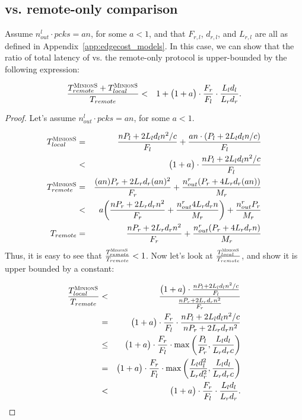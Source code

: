 \subsection{\system vs. remote-only comparison}
\label{app:edgecost_bound}

\begin{proposition}
\label{prop:latency_bound}
Assume $n_{out}^l \cdot pcks = an$, for some $a < 1$, and that $F_{r,l}$, $d_{r,l}$, and $L_{r,l}$ are all as defined in Appendix~\ref{app:edgecost_models}. In this case, we can show that the ratio of total latency of \system vs. the remote-only protocol is upper-bounded by the following expression:

\begin{eqnarray*}
\frac{T_{remote}^{\textsc{MinionS}} + T_{local}^{\textsc{MinionS}}}{T_{remote}} &<& 1 + \big(1 + a \big) \cdot \frac{F_r}{F_l} \cdot \frac{L_l d_l}{L_r d_r}. \\
\end{eqnarray*}

\begin{proof}
    
Let's assume $n_{out}^l \cdot pcks = an$, for some $a < 1$.

\begin{eqnarray*}
T_{local}^{\textsc{MinionS}} &=& \frac{n P_l + 2 L_l d_l n^2 /c}{F_l} + \frac{an \cdot (P_l + 2 L_l d_l n/c)}{F_l} \\
&<& \big(1 + a\big) \cdot \frac{n P_l + 2 L_l d_l n^2 /c}{F_l} \\
T_{remote}^{\textsc{MinionS}} &=& \frac{(an) P_r + 2 L_r d_r (an)^2}{F_r} + \frac{n_{out}^r (P_r + 4 L_r d_r (an) )}{M_r} \\
&<& a \bigg(\frac{nP_r + 2 L_r d_r n^2}{F_r} + \frac{n_{out}^r 4 L_r d_r n}{M_r}\bigg) + \frac{n_{out}^r P_r}{M_r}\\
T_{remote} &=& \frac{nP_r + 2 L_r d_r n^2}{F_r} + \frac{n_{out}^r (P_r + 4 L_r d_r n )}{M_r}
\end{eqnarray*}
Thus, it is easy to see that $\frac{T_{remote}^{\textsc{MinionS}}}{T_{remote}} < 1$.
Now let's look at $\frac{T_{local}^{\textsc{MinionS}}}{T_{remote}}$, and show it is upper bounded by a constant:

\begin{eqnarray*}
\frac{T_{local}^{\textsc{MinionS}}}{T_{remote}} &<& \frac{\big(1 + a\big) \cdot \frac{n P_l + 2 L_l d_l n^2 /c}{F_l}}{ \frac{nP_r + 2 L_r d_r n^2}{F_r}} \\
&=& \big(1 + a \big) \cdot \frac{F_r}{F_l} \cdot \frac{n P_l + 2 L_l d_l n^2 /c}{nP_r + 2 L_r d_r n^2} \\
&\leq& \big(1 + a \big) \cdot \frac{F_r}{F_l} \cdot \max\bigg(\frac{P_l}{P_r}, \frac{L_l d_l}{L_r d_r c}\bigg) \\
&=& \big(1 + a \big) \cdot \frac{F_r}{F_l} \cdot \max\bigg(\frac{L_l d_l^2}{L_r d_r^2}, \frac{L_l d_l}{L_r d_r c}\bigg) \\
&<& \big(1 + a \big) \cdot \frac{F_r}{F_l} \cdot \frac{L_l d_l}{L_r d_r}.\\
\end{eqnarray*}


\end{proof}
\end{proposition}
